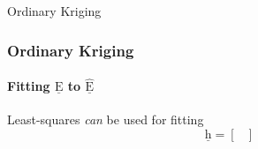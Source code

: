\documentclass[professionalfont,10pt]{beamer}
\begin{document}
	\begin{frame}[t]{Ordinary Kriging}
	\frametitle{Ordinary Kriging}
	\framesubtitle{Fitting $\underline{\text{E}}$ to $\hat{\underline{\text{E}}}$}
	\hskip-0.75cm
	\begin{minipage}[t]{0.2\linewidth}\vspace{-0.5cm}
		\tiny\tableofcontents[currentsection,currentsubsection,hideothersubsections,subsectionstyle=show/shaded]
	\end{minipage}
	\hfill%
	\begin{minipage}[t]{0.86\linewidth}\vspace{-0.5cm}
		Least-squares \textit{can} be used for fitting
		\begin{equation}
			\underline{\text{h}} = \left[\begin{array}{cccc}
				
			\end{array}\right]
		\end{equation}
	\end{minipage}
	\vfill%
\end{frame}
%		
%		
%		


	
\end{document}
